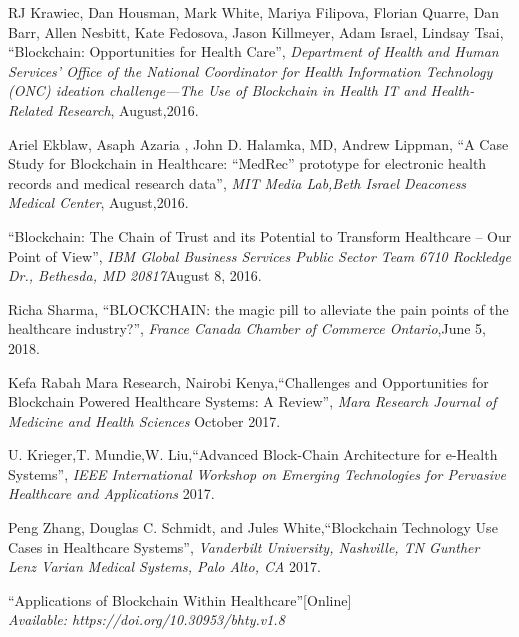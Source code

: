 \documentclass[12pt]{report}
\begin{document}

\begin{thebibliography}{100} 

 RJ Krawiec, Dan Housman, Mark White, Mariya Filipova,
Florian Quarre, Dan Barr, Allen Nesbitt, Kate Fedosova,
Jason Killmeyer, Adam Israel, Lindsay Tsai, \textquotedblleft Blockchain:
Opportunities for Health Care\textquotedblright, \textit{Department of Health and Human Services’ Office of the National Coordinator for Health
Information Technology (ONC) ideation challenge—The Use of Blockchain in Health IT and Health-Related Research}, August,2016.


 Ariel Ekblaw, Asaph Azaria , John D. Halamka, MD, Andrew Lippman, \textquotedblleft A Case Study for Blockchain in Healthcare:
“MedRec” prototype for electronic health records and medical research data\textquotedblright, \textit{MIT Media Lab,Beth Israel Deaconess Medical Center}, August,2016.


 \textquotedblleft Blockchain: The Chain of Trust and its Potential to Transform Healthcare – Our Point of View\textquotedblright, \textit{IBM Global Business Services Public Sector Team 6710 Rockledge Dr., Bethesda, MD 20817}August 8, 2016.

 Richa Sharma, \textquotedblleft BLOCKCHAIN: the magic pill to alleviate the pain
points of the healthcare industry?\textquotedblright, \textit{France Canada Chamber of Commerce Ontario},June 5, 2018.

Kefa Rabah Mara Research, Nairobi Kenya,\textquotedblleft Challenges and Opportunities for Blockchain Powered Healthcare Systems: A Review\textquotedblright, \textit{Mara Research Journal of Medicine and Health Sciences} October 2017.

U. Krieger,T. Mundie,W. Liu,\textquotedblleft Advanced Block-Chain Architecture for e-Health Systems\textquotedblright, \textit{IEEE International
Workshop on Emerging Technologies for Pervasive Healthcare and Applications} 2017.

Peng Zhang, Douglas C. Schmidt, and Jules White,\textquotedblleft Blockchain Technology Use Cases in Healthcare Systems\textquotedblright, \textit{Vanderbilt University, Nashville, TN Gunther Lenz
Varian Medical Systems, Palo Alto, CA} 2017.


 \textquotedblleft Applications of Blockchain Within Healthcare\textquotedblright[Online]\\ 
\textit{Available: https://doi.org/10.30953/bhty.v1.8}



\end{thebibliography}
\end{document}
